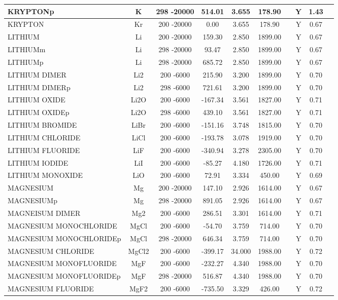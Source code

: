 \begin{longtable}{@{\extracolsep{\fill}}|l|c|c|c|c|c|c|c|c|l|}
KRYPTONp&K&298 -20000&  514.01& 3.655&   178.90& &Y& 1.43&\\ \hline
KRYPTON&Kr&200 -20000&    0.00& 3.655&   178.90& &Y& 0.67&\\ \hline
LITHIUM&Li&200 -20000&  159.30& 2.850&  1899.00& &Y& 0.67&\\ \hline
LITHIUMm&Li&298 -20000&   93.47& 2.850&  1899.00& &Y& 0.67&\\ \hline
LITHIUMp&Li&298 -20000&  685.72& 2.850&  1899.00& &Y& 0.67&\\ \hline
LITHIUM DIMER&Li2&200 -6000&  215.90& 3.200&  1899.00& &Y& 0.70&\\ \hline
LITHIUM DIMERp&Li2&298 -6000&  721.61& 3.200&  1899.00& &Y& 0.70&\\ \hline
LITHIUM OXIDE&Li2O&200 -6000& -167.34& 3.561&  1827.00& &Y& 0.71&\\ \hline
LITHIUM OXIDEp&Li2O&298 -6000&  439.10& 3.561&  1827.00& &Y& 0.71&\\ \hline
LITHIUM BROMIDE&LiBr&200 -6000& -151.16& 3.748&  1815.00& &Y& 0.70&\\ \hline
LITHIUM CHLORIDE&LiCl&200 -6000& -193.78& 3.078&  1919.00& &Y& 0.70&\\ \hline
LITHIUM FLUORIDE&LiF&200 -6000& -340.94& 3.278&  2305.00& &Y& 0.70&\\ \hline
LITHIUM IODIDE&LiI&200 -6000&  -85.27& 4.180&  1726.00& &Y& 0.71&\\ \hline
LITHIUM MONOXIDE&LiO&200 -6000&   72.91& 3.334&   450.00& &Y& 0.69&\\ \hline
MAGNESIUM&Mg&200 -20000&  147.10& 2.926&  1614.00& &Y& 0.67&\\ \hline
MAGNESIUMp&Mg&298 -20000&  891.05& 2.926&  1614.00& &Y& 0.67&\\ \hline
MAGNEISUM DIMER&Mg2&200 -6000&  286.51& 3.301&  1614.00& &Y& 0.71&\\ \hline
MAGNESIUM MONOCHLORIDE&MgCl&200 -6000&  -54.70& 3.759&   714.00& &Y& 0.70&\\ \hline
MAGNESIUM MONOCHLORIDEp&MgCl&298 -20000&  646.34& 3.759&   714.00& &Y& 0.70&\\ \hline
MAGNESIUM CHLORIDE&MgCl2&200 -6000& -399.17&34.000&  1988.00& &Y& 0.72&\\ \hline
MAGNESIUM MONOFLUORIDE&MgF&200 -6000& -232.27& 4.340&  1988.00& &Y& 0.70&\\ \hline
MAGNESIUM MONOFLUORIDEp&MgF&298 -20000&  516.87& 4.340&  1988.00& &Y& 0.70&\\ \hline
MAGNESIUM FLUORIDE&MgF2&200 -6000& -735.50& 3.329&   426.00& &Y& 0.72&\\ \hline

\end{longtable}
